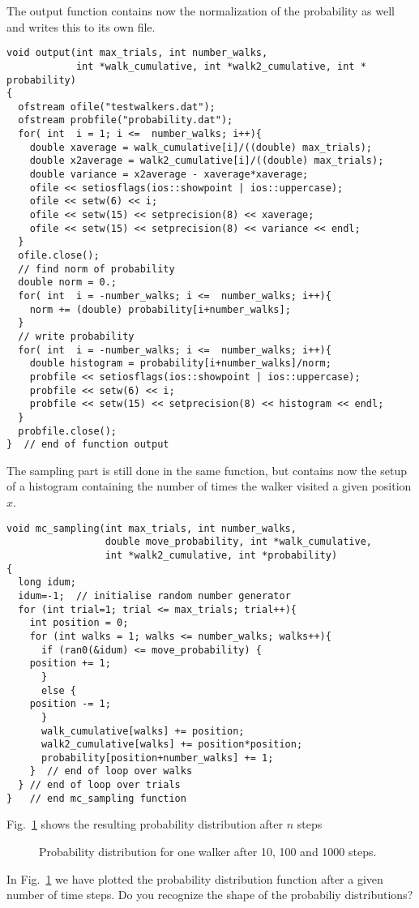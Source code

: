 The output function contains now the normalization of the probability as well
and writes this to its own file.
\begin{lstlisting}
void output(int max_trials, int number_walks, 
            int *walk_cumulative, int *walk2_cumulative, int * probability)
{
  ofstream ofile("testwalkers.dat");
  ofstream probfile("probability.dat");
  for( int  i = 1; i <=  number_walks; i++){
    double xaverage = walk_cumulative[i]/((double) max_trials);
    double x2average = walk2_cumulative[i]/((double) max_trials);
    double variance = x2average - xaverage*xaverage;
    ofile << setiosflags(ios::showpoint | ios::uppercase);
    ofile << setw(6) << i;
    ofile << setw(15) << setprecision(8) << xaverage;
    ofile << setw(15) << setprecision(8) << variance << endl;
  }
  ofile.close();
  // find norm of probability
  double norm = 0.;
  for( int  i = -number_walks; i <=  number_walks; i++){
    norm += (double) probability[i+number_walks];
  }
  // write probability
  for( int  i = -number_walks; i <=  number_walks; i++){
    double histogram = probability[i+number_walks]/norm;
    probfile << setiosflags(ios::showpoint | ios::uppercase);
    probfile << setw(6) << i;
    probfile << setw(15) << setprecision(8) << histogram << endl;
  }
  probfile.close();
}  // end of function output 
\end{lstlisting}
The sampling part is still done in the same function, but contains now
the setup of a histogram containing the number of times the walker visited 
a given position $x$.
\begin{lstlisting}
void mc_sampling(int max_trials, int number_walks, 
                 double move_probability, int *walk_cumulative, 
                 int *walk2_cumulative, int *probability)
{
  long idum;
  idum=-1;  // initialise random number generator
  for (int trial=1; trial <= max_trials; trial++){
    int position = 0;
    for (int walks = 1; walks <= number_walks; walks++){   
      if (ran0(&idum) <= move_probability) {
	position += 1;
      } 
      else {
	position -= 1;
      }
      walk_cumulative[walks] += position;
      walk2_cumulative[walks] += position*position;
      probability[position+number_walks] += 1;
    }  // end of loop over walks
  } // end of loop over trials
}   // end mc_sampling function  
\end{lstlisting}
Fig.~\ref{fig:randomprobability} shows the resulting probability distribution after 
$n$ steps
\begin{figure} 
\begin{center}

\caption{Probability distribution for one walker after 10, 100 and 1000 steps.\label{fig:randomprobability}}
\end{center}
\end{figure}
In  Fig.~\ref{fig:randomprobability} we have plotted the probability distribution function after a given number of time steps.
Do you recognize the shape of the probabiliy distributions?




